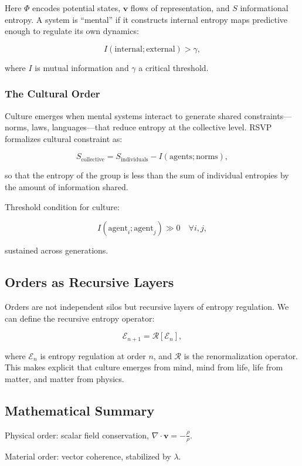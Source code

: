 \documentclass[12pt]{book}
\begin{document}
Here \( \Phi \) encodes potential states, \( \mathbf{v} \) flows of representation, and \( S \) informational entropy. A system is “mental” if it constructs internal entropy maps predictive enough to regulate its own dynamics:

\[ I(\text{internal}; \text{external}) > \gamma, \]

where \( I \) is mutual information and \( \gamma \) a critical threshold.

\subsubsection{The Cultural Order}
Culture emerges when mental systems interact to generate shared constraints—norms, laws, languages—that reduce entropy at the collective level. RSVP formalizes cultural constraint as:

\[ S_{\text{collective}} = S_{\text{individuals}} - I(\text{agents}; \text{norms}), \]

so that the entropy of the group is less than the sum of individual entropies by the amount of information shared.

Threshold condition for culture:

\[ I(\text{agent}_i; \text{agent}_j) \gg 0 \quad \forall i,j, \]

sustained across generations.

\subsection{Orders as Recursive Layers}
Orders are not independent silos but recursive layers of entropy regulation. We can define the recursive entropy operator:

\[ \mathcal{E}_{n+1} = \mathcal{R}[\mathcal{E}_n], \]

where \( \mathcal{E}_n \) is entropy regulation at order \( n \), and \( \mathcal{R} \) is the renormalization operator. This makes explicit that culture emerges from mind, mind from life, life from matter, and matter from physics.

\subsection{Mathematical Summary}
Physical order: scalar field conservation, \( \nabla \cdot \mathbf{v} = -\frac{\dot{\rho}}{\rho} \).

Material order: vector coherence, stabilized by \( \lambda \).
\end{document}
